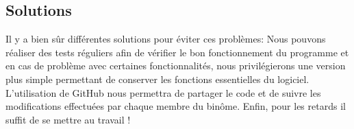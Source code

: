 \subsection{Solutions}
Il y a bien sûr différentes solutions pour éviter ces problèmes:
\newline 
Nous pouvons réaliser des tests réguliers afin de vérifier le bon fonctionnement du programme et en cas de problème avec certaines fonctionnalités, nous privilégierons une version plus simple permettant de conserver les fonctions essentielles du logiciel.
\newline
L'utilisation de GitHub nous permettra de partager le code et de suivre les modifications effectuées par chaque membre du binôme.
\newline
Enfin, pour les retards il suffit de se mettre au travail !
